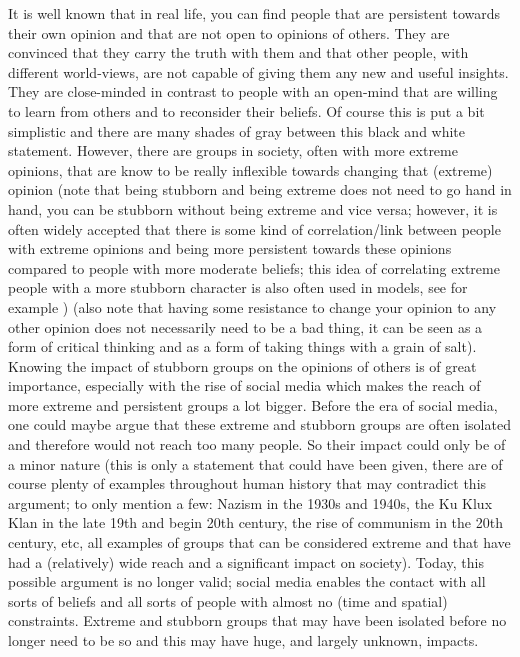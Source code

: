 \documentclass[11 pt , letterpaper , twoside , openright]{book}
\begin{document}
It is well known that in real life, you can find people that are persistent towards their own opinion and that are not open to opinions of others. They are convinced that they carry the truth with them and that other people, with different world-views, are not capable of giving them any new and useful insights. They are close-minded in contrast to people with an open-mind that are willing to learn from others and to reconsider their beliefs. Of course this is put a bit simplistic and there are many shades of gray between this black and white statement. However, there are groups in society, often with more extreme opinions, that are know to be really inflexible towards changing that (extreme) opinion (note that being stubborn and being extreme does not need to go hand in hand, you can be stubborn without being extreme and vice versa; however, it is often widely accepted that there is some kind of correlation/link between people with extreme opinions and being more persistent towards these opinions compared to people with more moderate beliefs; this idea of correlating extreme people with a more stubborn character is also often used in models, see for example \cite{Deffuant2006}\cite{Deffuant2002}\cite{Turner}) (also note that having some resistance to change your opinion to any other opinion does not necessarily need to be a bad thing, it can be seen as a form of critical thinking and as a form of taking things with a grain of salt).\\ 
\newline
Knowing the impact of stubborn groups on the opinions of others is of great importance, especially with the rise of social media which makes the reach of more extreme and persistent groups a lot bigger. Before the era of social media, one could maybe argue that these extreme and stubborn groups are often isolated and therefore would not reach too many people. So their impact could only be of a minor nature (this is only a statement that could have been given, there are of course plenty of examples throughout human history that may contradict this argument; to only mention a few: Nazism in the 1930s and 1940s, the Ku Klux Klan in the late 19th and begin 20th century, the rise of communism in the 20th century, etc, all examples of groups that can be considered extreme and that have had a (relatively) wide reach and a significant impact on society). Today, this possible argument is no longer valid; social media enables the contact with all sorts of beliefs and all sorts of people with almost no (time and spatial) constraints. Extreme and stubborn groups that may have been isolated before no longer need to be so and this may have huge, and largely unknown, impacts. \\
\end{document}
